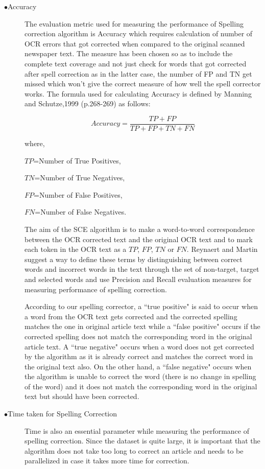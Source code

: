 \documentclass[letterpaper,11pt]{report}
\begin{document}
\begin{description}

 \item[$\bullet$Accuracy]
 The evaluation metric used for measuring the performance of Spelling correction algorithm is Accuracy which requires calculation of number of OCR errors that got corrected when compared to the original scanned newspaper text. The measure has been chosen so as to include the complete text coverage and not just check for words that got corrected after spell correction as in the latter case, the  number of FP and TN get missed which won't give the correct measure of how well the spell corrector works. The formula used for calculating Accuracy is defined by Manning and Schutze,1999 (p.268-269) as follows:

$$Accuracy=  \dfrac{TP+FP} {TP+ FP + TN + FN}$$


where, 

$TP$=Number of True Positives,

$TN$=Number of True Negatives,

 $FP$=Number of False Positives,

 $FN$=Number of False Negatives. 

The aim of the SCE algorithm is to make a word-to-word correspondence between the OCR corrected text and the original OCR text and to mark each token in the OCR text as a $TP$, $FP$, $TN$ or $FN$. Reynaert and Martin\cite{reynaert2008all} suggest a way to define these terms by distinguishing between correct words and incorrect words in the text through the set of non-target, target and selected words and use Precision and Recall evaluation measures for measuring performance of spelling correction. 

According to our spelling corrector, a ``true positive" is said to occur when a word from the OCR text gets corrected and the corrected spelling matches the one in original article text while a ``false positive" occurs if the corrected spelling does not match the corresponding word in the original article text. A ``true negative" occurs when a word does not get corrected by the algorithm as it is already correct and matches the correct word in the original text also. On the other hand, a ``false negative" occurs when the algorithm is unable to correct the word (there is no change in spelling of the word) and it does not match the corresponding word in the original text but should have been corrected.



\item[$\bullet$Time taken for Spelling Correction]
Time is also an essential parameter while measuring the performance of spelling correction. Since the dataset is quite large, it is important that the algorithm does not take too long to correct an article and needs to be parallelized in case it takes more time for correction.



\end{description}
\end{document}
